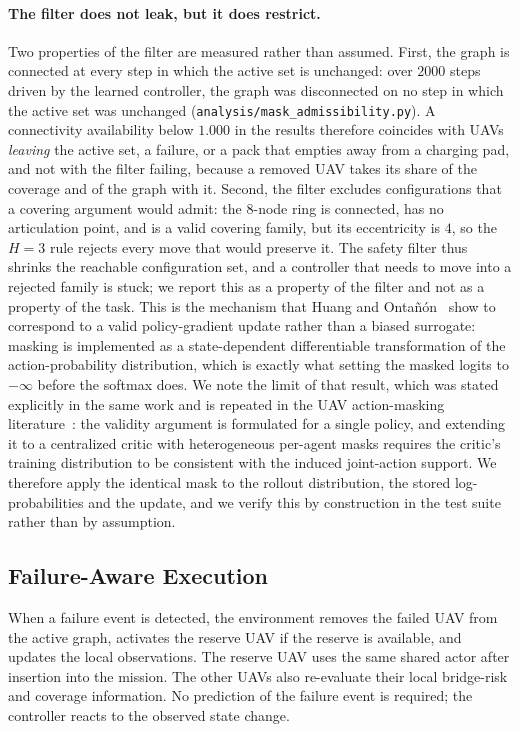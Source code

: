 \documentclass[conference]{IEEEtran}
\newcommand{\tokEpisodeSteps}{2000}
\begin{document}
\paragraph{The filter does not leak, but it does restrict.} Two properties of the
filter are measured rather than assumed.  First, the graph is connected at
every step in which the active set is unchanged: over $\tokEpisodeSteps$ steps
driven by the learned controller, the graph was disconnected on no step in
which the active set was unchanged
(\texttt{analysis/mask\_admissibility.py}).  A connectivity availability
below $1.000$ in the results therefore coincides with UAVs \emph{leaving}
the active set, a failure, or a pack that empties away from a charging
pad, and not with the filter failing, because a removed UAV takes its
share of the coverage and of the graph with it.  Second, the filter
excludes configurations that a covering argument would admit: the
$8$-node ring is connected, has no articulation point, and is a valid
covering family, but its eccentricity is $4$, so the $H=3$ rule rejects
every move that would preserve it.  The safety filter thus shrinks the
reachable configuration set, and a controller that needs to move into a
rejected family is stuck; we report this as a property of the filter and
not as a property of the task. This is the mechanism that Huang and Onta\~n\'on~\cite{huang2022} show to correspond to a valid policy-gradient update rather than a biased surrogate: masking is implemented as a state-dependent differentiable transformation of the action-probability distribution, which is exactly what setting the masked logits to $-\infty$ before the softmax does. We note the limit of that result, which was stated explicitly in the same work and is repeated in the UAV action-masking literature~\cite{rizvi2025}: the validity argument is formulated for a single policy, and extending it to a centralized critic with heterogeneous per-agent masks requires the critic's training distribution to be consistent with the induced joint-action support. We therefore apply the identical mask to the rollout distribution, the stored log-probabilities and the update, and we verify this by construction in the test suite rather than by assumption.

\subsection{Failure-Aware Execution}
When a failure event is detected, the environment removes the failed UAV from the active graph, activates the reserve UAV if the reserve is available, and updates the local observations. The reserve UAV uses the same shared actor after insertion into the mission. The other UAVs also re-evaluate their local bridge-risk and coverage information. No prediction of the failure event is required; the controller reacts to the observed state change.
\end{document}
